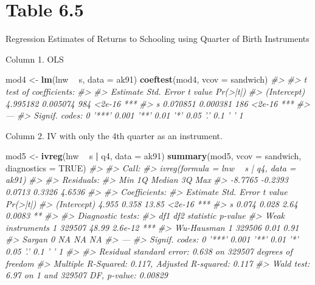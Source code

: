 \documentclass[]{book}
\newenvironment{Shaded}{\begin{snugshade}}{\end{snugshade}}
\newcommand{\CommentTok}[1]{\textcolor[rgb]{0.56,0.35,0.01}{\textit{#1}}}
\newcommand{\DataTypeTok}[1]{\textcolor[rgb]{0.13,0.29,0.53}{#1}}
\newcommand{\KeywordTok}[1]{\textcolor[rgb]{0.13,0.29,0.53}{\textbf{#1}}}
\newcommand{\NormalTok}[1]{#1}
\newcommand{\OperatorTok}[1]{\textcolor[rgb]{0.81,0.36,0.00}{\textbf{#1}}}
\newcommand{\OtherTok}[1]{\textcolor[rgb]{0.56,0.35,0.01}{#1}}
\newcommand{\StringTok}[1]{\textcolor[rgb]{0.31,0.60,0.02}{#1}}
\theoremstyle{definition}
\theoremstyle{definition}
\theoremstyle{definition}
\theoremstyle{remark}
\begin{document}
\hypertarget{table-6.5}{%
\section{Table 6.5}\label{table-6.5}}

Regression Estimates of Returns to Schooling using Quarter of Birth
Instruments

Column 1. OLS

\begin{Shaded}
\begin{Highlighting}[]
\NormalTok{mod4 <-}\StringTok{ }\KeywordTok{lm}\NormalTok{(lnw }\OperatorTok{~}\StringTok{ }\NormalTok{s, }\DataTypeTok{data =}\NormalTok{ ak91)}
\KeywordTok{coeftest}\NormalTok{(mod4, }\DataTypeTok{vcov =}\NormalTok{ sandwich)}
\CommentTok{#> }
\CommentTok{#> t test of coefficients:}
\CommentTok{#> }
\CommentTok{#>             Estimate Std. Error t value Pr(>|t|)    }
\CommentTok{#> (Intercept) 4.995182   0.005074     984   <2e-16 ***}
\CommentTok{#> s           0.070851   0.000381     186   <2e-16 ***}
\CommentTok{#> ---}
\CommentTok{#> Signif. codes:  0 '***' 0.001 '**' 0.01 '*' 0.05 '.' 0.1 ' ' 1}
\end{Highlighting}
\end{Shaded}

Column 2. IV with only the 4th quarter as an instrument.

\begin{Shaded}
\begin{Highlighting}[]
\NormalTok{mod5 <-}\StringTok{ }\KeywordTok{ivreg}\NormalTok{(lnw }\OperatorTok{~}\StringTok{ }\NormalTok{s }\OperatorTok{|}\StringTok{ }\NormalTok{q4, }\DataTypeTok{data =}\NormalTok{ ak91)}
\KeywordTok{summary}\NormalTok{(mod5, }\DataTypeTok{vcov =}\NormalTok{ sandwich, }\DataTypeTok{diagnostics =} \OtherTok{TRUE}\NormalTok{)}
\CommentTok{#> }
\CommentTok{#> Call:}
\CommentTok{#> ivreg(formula = lnw ~ s | q4, data = ak91)}
\CommentTok{#> }
\CommentTok{#> Residuals:}
\CommentTok{#>     Min      1Q  Median      3Q     Max }
\CommentTok{#> -8.7765 -0.2393  0.0713  0.3326  4.6536 }
\CommentTok{#> }
\CommentTok{#> Coefficients:}
\CommentTok{#>             Estimate Std. Error t value Pr(>|t|)    }
\CommentTok{#> (Intercept)    4.955      0.358   13.85   <2e-16 ***}
\CommentTok{#> s              0.074      0.028    2.64   0.0083 ** }
\CommentTok{#> }
\CommentTok{#> Diagnostic tests:}
\CommentTok{#>                     df1    df2 statistic p-value    }
\CommentTok{#> Weak instruments      1 329507     48.99 2.6e-12 ***}
\CommentTok{#> Wu-Hausman            1 329506      0.01    0.91    }
\CommentTok{#> Sargan                0     NA        NA      NA    }
\CommentTok{#> ---}
\CommentTok{#> Signif. codes:  0 '***' 0.001 '**' 0.01 '*' 0.05 '.' 0.1 ' ' 1}
\CommentTok{#> }
\CommentTok{#> Residual standard error: 0.638 on 329507 degrees of freedom}
\CommentTok{#> Multiple R-Squared: 0.117,   Adjusted R-squared: 0.117 }
\CommentTok{#> Wald test: 6.97 on 1 and 329507 DF,  p-value: 0.00829}
\end{Highlighting}
\end{Shaded}
\end{document}
